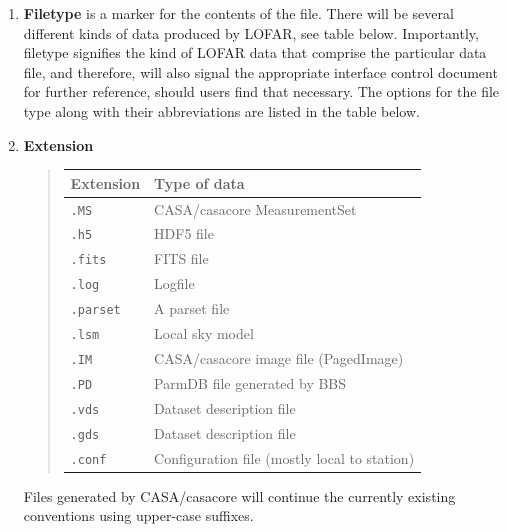 \begin{enumerate}
\item \textbf{Filetype} is a marker for the contents of the
  file. There will be several different kinds of data produced by
  LOFAR, see table below. Importantly, filetype signifies the kind of
  LOFAR data that comprise the particular data file, and therefore,
  will also signal the appropriate interface control document for
  further reference, should users find that necessary. The options for
  the file type along with their abbreviations are listed in the table below.
  
  
\item \textbf{Extension}
  \begin{verse}
    \begin{tabular}{|ll|}
      \hline
      \textbf{Extension} & \textbf{Type of data} \\
      \hline \hline
      \verb|.MS|     & CASA/casacore MeasurementSet \\
      \verb|.h5|     & HDF5 file \\
      \verb|.fits|   & FITS file \\
      \verb|.log|    & Logfile \\
      \verb|.parset| & A parset file \\
      \verb|.lsm|    & Local sky model \\
      \verb|.IM|     & CASA/casacore image file (PagedImage) \\
      \verb|.PD|     & ParmDB file generated by BBS \\
      \verb|.vds|    & Dataset description file \\
      \verb|.gds|    & Dataset description file \\
      \verb|.conf|   & Configuration file (mostly local to station) \\
      \hline
    \end{tabular}
  \end{verse}
  Files generated by CASA/casacore will continue the currently
  existing conventions using upper-case suffixes.
\end{enumerate}
